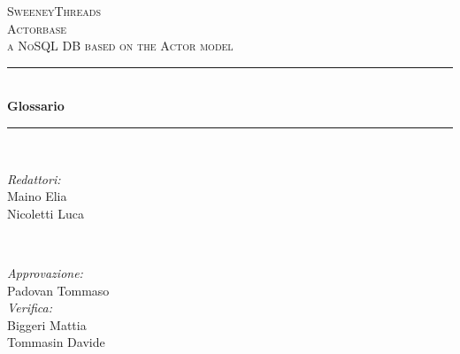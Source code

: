 \documentclass[a4paper]{article}
\begin{document}
	
	\begin{titlepage}
		\newcommand{\HRule}{\rule{\linewidth}{0.5mm}} 
		\center  
		
		\textsc{\LARGE SweeneyThreads}\\[1.5cm] 
		\textsc{\Large Actorbase}\\[0.5cm] 
		\textsc{\large a NoSQL DB based on the Actor model}\\[0.5cm]
		
		
		\HRule \\[0.4cm]
		{ \huge \bfseries Glossario}\\[0.4cm] 
		\HRule \\[1.5cm]
		
		\begin{minipage}{0.4\textwidth}
			\begin{flushleft} \large
				\emph{Redattori:}\\
				Maino Elia\\
				Nicoletti Luca
			\end{flushleft}
		\end{minipage}
		~
		\begin{minipage}{0.4\textwidth}
			\begin{flushright} \large
				\emph{Approvazione:} \\
				Padovan Tommaso \\
				\emph{Verifica:} \\
				Biggeri Mattia \\
				Tommasin Davide 
			\end{flushright}
		\end{minipage}
		

\end{titlepage}
\end{document}
